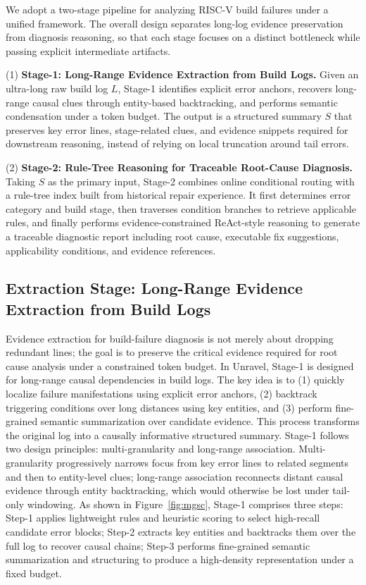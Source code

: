 \documentclass[sigconf]{acmart}
\begin{document}
We adopt a two-stage pipeline for analyzing RISC-V build failures under a unified framework. The overall design separates long-log evidence preservation from diagnosis reasoning, so that each stage focuses on a distinct bottleneck while passing explicit intermediate artifacts.

(1) \textbf{Stage-1: Long-Range Evidence Extraction from Build Logs.} Given an ultra-long raw build log $L$, Stage-1 identifies explicit error anchors, recovers long-range causal clues through entity-based backtracking, and performs semantic condensation under a token budget. The output is a structured summary $S$ that preserves key error lines, stage-related clues, and evidence snippets required for downstream reasoning, instead of relying on local truncation around tail errors.

(2) \textbf{Stage-2: Rule-Tree Reasoning for Traceable Root-Cause Diagnosis.} Taking $S$ as the primary input, Stage-2 combines online conditional routing with a rule-tree index built from historical repair experience. It first determines error category and build stage, then traverses condition branches to retrieve applicable rules, and finally performs evidence-constrained ReAct-style reasoning to generate a traceable diagnostic report including root cause, executable fix suggestions, applicability conditions, and evidence references.

\subsection{Extraction Stage: Long-Range Evidence Extraction from Build Logs}\label{sec:ceel}

Evidence extraction for build-failure diagnosis is not merely about dropping redundant lines; the goal is to preserve the critical evidence required for root cause analysis under a constrained token budget. In Unravel, Stage-1 is designed for long-range causal dependencies in build logs. The key idea is to (1) quickly localize failure manifestations using explicit error anchors, (2) backtrack triggering conditions over long distances using key entities, and (3) perform fine-grained semantic summarization over candidate evidence. This process transforms the original log into a causally informative structured summary. Stage-1 follows two design principles: multi-granularity and long-range association. Multi-granularity progressively narrows focus from key error lines to related segments and then to entity-level clues; long-range association reconnects distant causal evidence through entity backtracking, which would otherwise be lost under tail-only windowing. As shown in Figure~\ref{fig:mgsc}, Stage-1 comprises three steps: Step-1 applies lightweight rules and heuristic scoring to select high-recall candidate error blocks; Step-2 extracts key entities and backtracks them over the full log to recover causal chains; Step-3 performs fine-grained semantic summarization and structuring to produce a high-density representation under a fixed budget.
\end{document}
